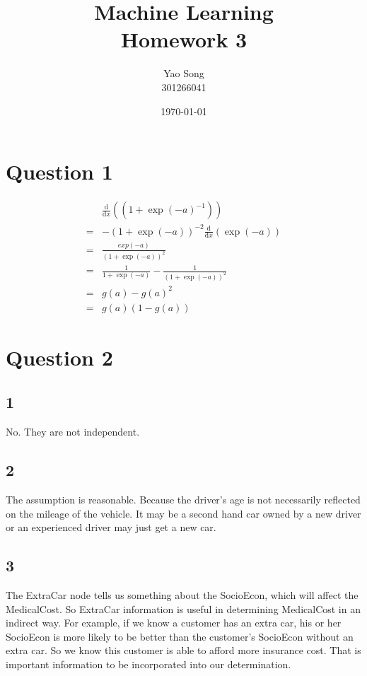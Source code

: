 \documentclass[paper=a4, fontsize=15pt]{article} %
\title{	
Machine Learning \\
Homework 3
}
\author{Yao Song\\301266041} %
\date{\normalsize\today} %
\begin{document}
\maketitle %

\section*{Question 1}
\begin{align}
&\frac{\mathrm d}{\mathrm d x} \left( (1+\exp(-a)^{-1}) \right) \\
=&-(1+\exp(-a))^{-2} \frac{\mathrm d}{\mathrm d x} \left( \exp(-a) \right)\\
=& \frac{exp(-a)}{(1+\exp(-a))^{2}}\\
=& \frac{1}{1+\exp(-a)} - \frac{1}{(1+\exp(-a))^{2}}\\
=& g(a) - g(a)^2\\
=& g(a)( 1- g(a) )
\end{align}


\section*{Question 2}
\subsection*{1}
No. They are not independent.
\subsection*{2}
The assumption is reasonable. Because the driver's age is not necessarily reflected on the mileage of the vehicle. It may be a second hand car owned by a new driver or an experienced driver may just get a new car.
\subsection*{3}
The ExtraCar node tells us something about the SocioEcon, which will affect the MedicalCost.
So ExtraCar information is useful in determining MedicalCost in an indirect way.
For example, if we know a customer has an extra car, his or her SocioEcon is more likely to be better than the customer's SocioEcon without an extra car. So we know this customer is able to afford more insurance cost. That is important information to be incorporated into our determination.
\end{document}
